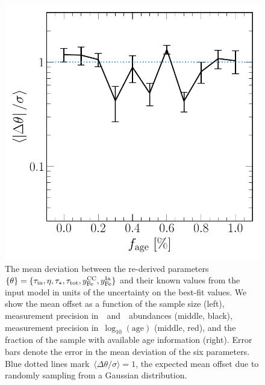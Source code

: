 \documentclass[ms.tex]{subfiles}
\begin{document}
\begin{figure}
\includegraphics[scale = 0.42]{dp_sigma_agefrac.pdf}
\caption{
The mean deviation between the re-derived parameters
$\{\theta\} = \{\tau_\text{in}, \eta, \tau_\star, \tau_\text{tot}, y_\text{Fe}^\text{CC},
y_\text{Fe}^\text{Ia}\}$ and their known values from the input model in units of the
uncertainty on the best-fit values.
We show the mean offset as a function of the sample size (left), measurement
precision in~\feh~and~\afe~abundances (middle, black), measurement precision
in~$\log_{10}(\text{age})$ (middle, red), and the fraction of the sample with
available age information (right).
Error bars denote the error in the mean deviation of the six parameters.
Blue dotted lines mark~$\langle \Delta \theta / \sigma \rangle = 1$, the
expected mean offset due to randomly sampling from a Gaussian distribution.
}
\label{fig:accuracy}
\end{figure}
\end{document}
